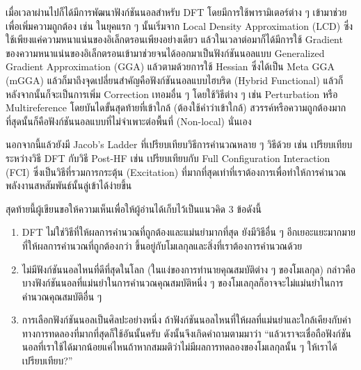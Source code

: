 เมื่อเวลาผ่านไปก็ได้มีการพัฒนาฟังก์ชันนอลสำหรับ DFT โดยมีการใช้พารามิเตอร์ต่าง ๆ เข้ามาช่วยเพื่อเพิ่มความถูกต้อง เช่น ในยุคแรก ๆ นั้นเริ่มจาก Local Density Approximation (LCD) ซึ่งใช้เพียงแค่ความหนาแน่นของอิเล็กตรอนเพียงอย่างเดียว แล้วในเวลาต่อมาก็ได้มีการใช้ Gradient ของความหนาแน่นของอิเล็กตรอนเข้ามาช่วยจนได้ออกมาเป็นฟังก์ชันนอลแบบ Generalized Gradient Approximation (GGA)\autocite{perdew1996} แล้วตามด้วยการใช้ Hessian ซึ่งได้เป็น Meta GGA (mGGA) แล้วก็มาถึงจุดเปลี่ยนสำคัญคือฟังก์ชันนอลแบบไฮบริด (Hybrid Functional) แล้วก็หลังจากนั้นก็จะเป็นการเพิ่ม Correction เทอมอื่น ๆ โดยใช้วิธีต่าง ๆ เช่น Perturbation หรือ Multireference โดยบันไดขั้นสุดท้ายที่เข้าใกล้ (ต้องใช้คำว่าเข้าใกล้) สวรรค์หรือความถูกต้องมากที่สุดนั้นก็คือฟังก์ชันนอลแบบที่ไม่จำเพาะต่อพื้นที่ (Non-local) นั่นเอง

นอกจากนี้แล้วยังมี Jacob's Ladder ที่เปรียบเทียบวิธีการคำนวณหลาย ๆ วิธีด้วย เช่น เปรียบเทียบระหว่างวิธี DFT กับวิธี Post-HF เช่น เปรียบเทียบกับ Full Configuration Interaction (FCI) ซึ่งเป็นวิธีที่รวมการกระตุ้น (Excitation) ที่มากที่สุดเท่าที่เราต้องการเพื่อทำให้การคำนวณพลังงานสหสัมพันธ์นั้นลู่เข้าได้ง่ายขึ้น

สุดท้ายนี้ผู้เขียนขอให้ความเห็นเพื่อให้ผู้อ่านได้เก็บไว้เป็นแนวคิด 3 ข้อดังนี้
%
\begin{enumerate}[topsep=0pt,noitemsep]\setlength\itemsep{0.5em}
    \item DFT ไม่ใช่วิธีที่ให้ผลการคำนวณที่ถูกต้องและแม่นยำมากที่สุด ยังมีวิธีอื่น ๆ อีกเยอะแยะมากมายที่ให้ผลการคำนวณที่ถูกต้องกว่า ขึ้นอยู่กับโมเลกุลและสิ่งที่เราต้องการคำนวณด้วย

    \item ไม่มีฟังก์ชันนอลไหนที่ดีที่สุดในโลก (ในแง่ของการทำนายคุณสมบัติต่าง ๆ ของโมเลกุล) กล่าวคือบางฟังก์ชันนอลที่แม่นยำในการคำนวณคุณสมบัติหนึ่ง ๆ ของโมเลกุลก็อาจจะไม่แม่นยำในการคำนวณคุณสมบัติอื่น ๆ

    \item การเลือกฟังก์ชันนอลเป็นศิลปะอย่างหนึ่ง ถ้าฟังก์ชันนอลไหนที่ให้ผลที่แม่นยำและใกล้เคียงกับค่าทางการทดลองที่มากที่สุดก็ใช้อันนั้นครับ ดังนั้นจึงเกิดคำถามตามมาว่า \enquote{แล้วเราจะเชื่อถือฟังก์ชันนอลที่เราใช้ได้มากน้อยแค่ไหนถ้าหากสมมติว่าไม่มีผลการทดลองของโมเลกุลนั้น ๆ ให้เราได้เปรียบเทียบ?}
\end{enumerate}

